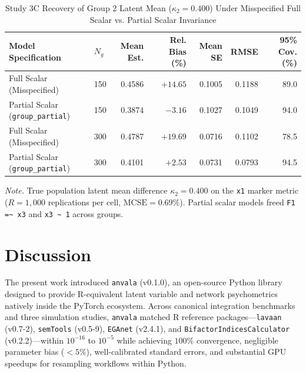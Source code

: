 ﻿\documentclass[12pt,letterpaper]{article}
\begin{document}
\begin{table}[htbp]
    \centering
    \caption{Study 3C Recovery of Group 2 Latent Mean ($\kappa_2 = 0.400$) Under Misspecified Full Scalar vs. Partial Scalar Invariance}
    \label{tab:study3c}
    \footnotesize
    \begin{tabular}{llrrrrr}
    \toprule
    Model Specification & $N_g$ & Mean Est. & Rel. Bias (\%) & Mean SE & RMSE & 95\% Cov. (\%) \\
    \midrule
    Full Scalar (Misspecified) & 150 & 0.4586 & $+14.65$ & 0.1005 & 0.1188 & 89.0 \\
    Partial Scalar (\texttt{group\_partial}) & 150 & 0.3874 & $-3.16$ & 0.1027 & 0.1049 & 94.0 \\
    \addlinespace
    Full Scalar (Misspecified) & 300 & 0.4787 & $+19.69$ & 0.0716 & 0.1102 & 78.5 \\
    Partial Scalar (\texttt{group\_partial}) & 300 & 0.4101 & $+2.53$ & 0.0731 & 0.0793 & 94.5 \\
    \bottomrule
    \end{tabular}
    \vspace{4pt}
    \par\noindent\footnotesize\textit{Note.} True population latent mean difference $\kappa_2 = 0.400$ on the \texttt{x1} marker metric ($R = 1{,}000$ replications per cell, $\mathrm{MCSE} = 0.69\%$). Partial scalar models freed \texttt{F1 =\textasciitilde{} x3} and \texttt{x3 \textasciitilde{} 1} across groups.
    \end{table}


\section{Discussion}

The present work introduced \texttt{anvala} (v0.1.0), an open-source Python library designed to provide R-equivalent latent variable and network psychometrics natively inside the PyTorch ecosystem. Across canonical integration benchmarks and three simulation studies, \texttt{anvala} matched R reference packages---\texttt{lavaan} (v0.7-2), \texttt{semTools} (v0.5-9), \texttt{EGAnet} (v2.4.1), and \texttt{BifactorIndicesCalculator} (v0.2.2)---within $10^{-16}$ to $10^{-5}$ while achieving $100\%$ convergence, negligible parameter bias ($< 5\%$), well-calibrated standard errors, and substantial GPU speedups for resampling workflows within Python.
\end{document}
